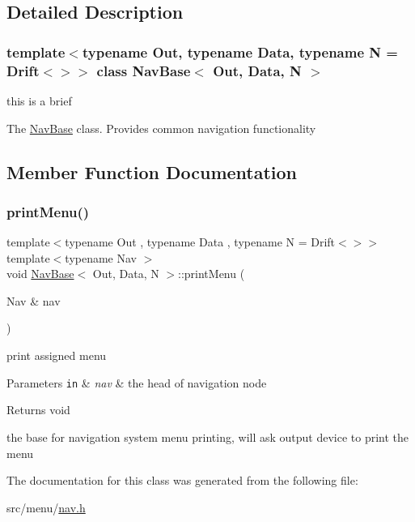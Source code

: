 \subsection{Detailed Description}
\subsubsection*{template$<$typename Out, typename Data, typename N = Drift$<$$>$$>$\newline
class Nav\+Base$<$ Out, Data, N $>$}

this is a brief 

The \hyperlink{classNavBase}{Nav\+Base} class. Provides common navigation functionality 

\subsection{Member Function Documentation}
\mbox{\label{classNavBase_aa6815bc1e6e2e4a03758e175e4582d46}} 
\subsubsection{\texorpdfstring{print\+Menu()}{printMenu()}}
{\footnotesize\ttfamily template$<$typename Out , typename Data , typename N  = Drift$<$$>$$>$ \\
template$<$typename Nav $>$ \\
void \hyperlink{classNavBase}{Nav\+Base}$<$ Out, Data, N $>$\+::print\+Menu (\begin{DoxyParamCaption}\item[{Nav \&}]{nav }\end{DoxyParamCaption})\hspace{0.3cm}{\ttfamily [inline]}}



print assigned menu 


\begin{DoxyParams}[1]{Parameters}
\mbox{\tt in}  & {\em nav} & the head of navigation node \\
\hline
\end{DoxyParams}
\begin{DoxyReturn}{Returns}
void
\end{DoxyReturn}
the base for navigation system menu printing, will ask output device to print the menu 

The documentation for this class was generated from the following file\+:\begin{DoxyCompactItemize}
\item 
src/menu/\hyperlink{nav_8h}{nav.\+h}\end{DoxyCompactItemize}

